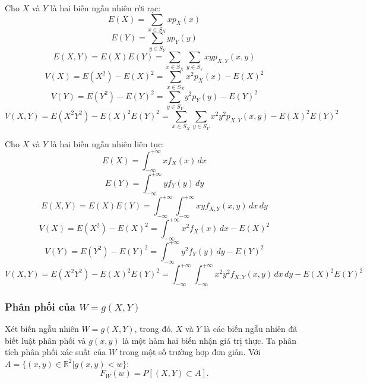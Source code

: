 \documentclass[12pt,a4paper]{article}
\begin{document}
\begin{dinhly}
Cho $X$ và $Y$ là hai biến ngẫu nhiên rời rạc:
\[
  E(X) = \displaystyle\sum_{x \in S_X} x p_X(x)
\]
\[
  E(Y) = \displaystyle\sum_{y \in S_Y} y p_Y(y)
\]
\[
  E(X, Y) = E(X)E(Y) = \displaystyle\sum_{x \in S_X} \displaystyle\sum_{y \in S_Y} x y p_{X,Y}(x, y)
\]
\[
  V(X) = E(X^2) - E(X)^2 = \displaystyle\sum_{x \in S_X} x^2 p_X(x) - E(X)^2
\]
\[
  V(Y) = E(Y^2) - E(Y)^2 = \displaystyle\sum_{y \in S_Y} y^2 p_Y(y) - E(Y)^2
\]
\[
  V(X, Y) = E(X^2Y^2) - E(X)^2E(Y)^2 = \displaystyle\sum_{x \in S_X} \displaystyle\sum_{y \in S_Y} x^2 y^2 p_{X,Y}(x, y) - E(X)^2E(Y)^2
\]

Cho $X$ và $Y$ là hai biến ngẫu nhiên liên tục:
\[
  E(X) = \displaystyle\int_{-\infty}^{+\infty} x f_X(x) \, dx
\]
\[
  E(Y) = \displaystyle\int_{-\infty}^{+\infty} y f_Y(y) \, dy
\]
\[
  E(X, Y) = E(X)E(Y) = \displaystyle\int_{-\infty}^{+\infty} \displaystyle\int_{-\infty}^{+\infty} x y f_{X,Y}(x, y) \, dx \, dy
\]
\[
  V(X) = E(X^2) - E(X)^2 = \displaystyle\int_{-\infty}^{+\infty} x^2 f_X(x) \, dx - E(X)^2
\]
\[
  V(Y) = E(Y^2) - E(Y)^2 = \displaystyle\int_{-\infty}^{+\infty} y^2 f_Y(y) \, dy - E(Y)^2
\]
\[
  V(X, Y) = E(X^2Y^2) - E(X)^2E(Y)^2 = \displaystyle\int_{-\infty}^{+\infty} \displaystyle\int_{-\infty}^{+\infty} x^2 y^2 f_{X,Y}(x, y) \, dx \, dy - E(X)^2E(Y)^2
\]
\end{dinhly}

\subsubsection{Phân phối của $W = g(X,Y)$}

\begin{dinhly}[title={Định lý}]
Xét biến ngẫu nhiên $W = g(X, Y)$, trong đó, $X$ và $Y$ là các biến ngẫu nhiên đã biết luật phân phối và $g(x, y)$ là một hàm hai biến nhận giá trị thực. Ta phân tích phân phối xác suất của $W$ trong một số trường hợp đơn giản.
Với $A = \{(x, y) \in \mathbb{R}^2 | g(x, y) < w\}$:
\[
  F_W(w) = P[(X, Y ) \subset A].
\]
\end{dinhly}
\end{document}
